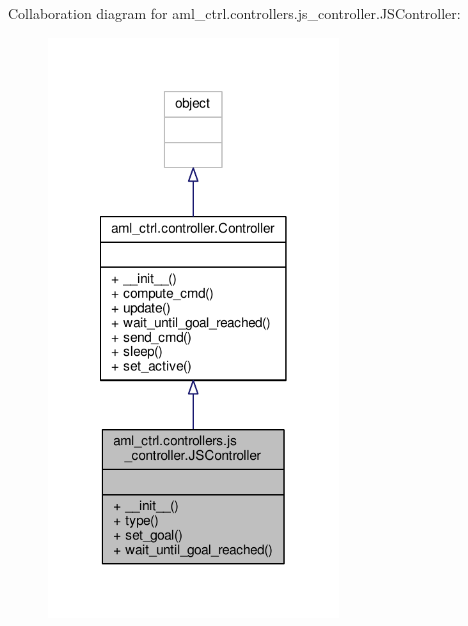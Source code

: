 Collaboration diagram for aml\-\_\-ctrl.\-controllers.\-js\-\_\-controller.\-J\-S\-Controller\-:\nopagebreak
\begin{figure}[H]
\begin{center}
\leavevmode
\includegraphics[width=218pt]{classaml__ctrl_1_1controllers_1_1js__controller_1_1_j_s_controller__coll__graph}
\end{center}
\end{figure}

